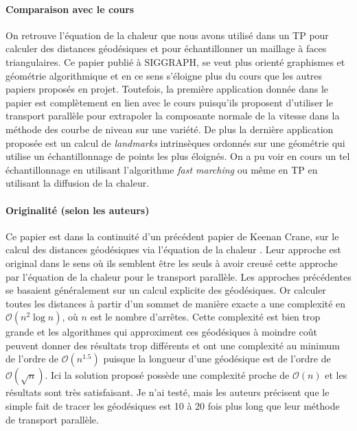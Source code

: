 \documentclass[11pt]{article}
\begin{document}
	\paragraph{Comparaison avec le cours}
	On retrouve l'équation de la chaleur que nous avons utilisé dans un TP pour calculer des distances géodésiques et pour échantillonner un maillage à faces triangulaires. Ce papier publié à SIGGRAPH, se veut plus orienté graphismes et géométrie algorithmique et en ce sens s'éloigne plus du cours que les autres papiers proposés en projet. Toutefois, la première application donnée dans le papier est complètement en lien avec le cours puisqu'ils proposent d'utiliser le transport parallèle pour extrapoler la composante normale de la vitesse dans la méthode des courbe de niveau sur une variété. De plus la dernière application proposée est un calcul de \textit{landmarks} intrinsèques ordonnés sur une géométrie qui utilise un échantillonnage de points les plus éloignés. On a pu voir en cours un tel échantillonnage en utilisant l'algorithme \textit{fast marching} ou même en TP en utilisant la diffusion de la chaleur.
	
	\paragraph{Originalité (selon les auteurs)}
	Ce papier est dans la continuité d'un précédent papier de Keenan Crane, sur le calcul des distances géodésiques via l'équation de la chaleur \cite{HM}. Leur approche est original dans le sens où ils semblent être les seuls à avoir creusé cette approche par l'équation de la chaleur pour le transport parallèle. Les approches précédentes se basaient généralement sur un calcul explicite des géodésiques. Or calculer toutes les distances à partir d'un sommet de manière exacte a une complexité en $\mathcal{O}(n^2 \log n)$, où $n$ est le nombre d'arrêtes. Cette complexité est bien trop grande et les algorithmes qui approximent ces géodésiques à moindre coût peuvent donner des résultats trop différents et ont une complexité au minimum de l'ordre de $\mathcal{O}(n^{1.5})$ puisque la longueur d'une géodésique est de l'ordre de $\mathcal{O}(\sqrt{n})$. Ici la solution proposé possède une complexité proche de $\mathcal{O}(n)$ et les résultats sont très satisfaisant. Je n'ai testé, mais les auteurs précisent que le simple fait de tracer les géodésiques est 10 à 20 fois plus long que leur méthode de transport parallèle.
	
\end{document}
